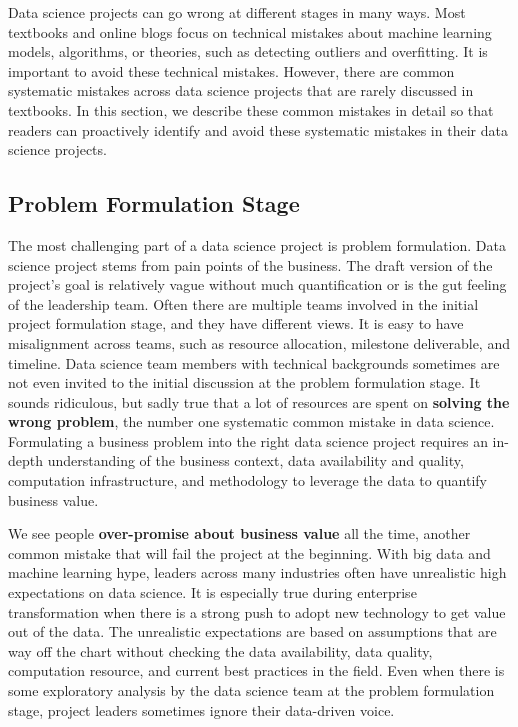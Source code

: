 \documentclass[12pt,]{krantz}
\begin{document}
Data science projects can go wrong at different stages in many ways. Most textbooks and online blogs focus on technical mistakes about machine learning models, algorithms, or theories, such as detecting outliers and overfitting. It is important to avoid these technical mistakes. However, there are common systematic mistakes across data science projects that are rarely discussed in textbooks. In this section, we describe these common mistakes in detail so that readers can proactively identify and avoid these systematic mistakes in their data science projects.

\hypertarget{problem-formulation-stage}{%
\subsection{Problem Formulation Stage}\label{problem-formulation-stage}}

The most challenging part of a data science project is problem formulation. Data science project stems from pain points of the business. The draft version of the project's goal is relatively vague without much quantification or is the gut feeling of the leadership team. Often there are multiple teams involved in the initial project formulation stage, and they have different views. It is easy to have misalignment across teams, such as resource allocation, milestone deliverable, and timeline. Data science team members with technical backgrounds sometimes are not even invited to the initial discussion at the problem formulation stage. It sounds ridiculous, but sadly true that a lot of resources are spent on \textbf{solving the wrong problem}, the number one systematic common mistake in data science. Formulating a business problem into the right data science project requires an in-depth understanding of the business context, data availability and quality, computation infrastructure, and methodology to leverage the data to quantify business value.

We see people \textbf{over-promise about business value} all the time, another common mistake that will fail the project at the beginning. With big data and machine learning hype, leaders across many industries often have unrealistic high expectations on data science. It is especially true during enterprise transformation when there is a strong push to adopt new technology to get value out of the data. The unrealistic expectations are based on assumptions that are way off the chart without checking the data availability, data quality, computation resource, and current best practices in the field. Even when there is some exploratory analysis by the data science team at the problem formulation stage, project leaders sometimes ignore their data-driven voice.
\end{document}
